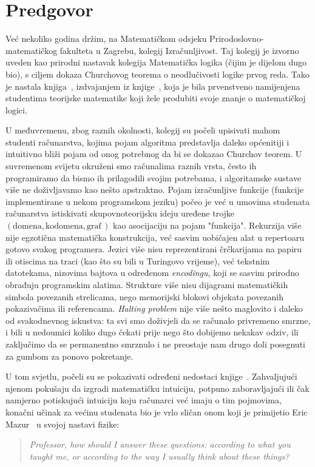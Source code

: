 \chapter{Predgovor}


Već nekoliko godina držim, na Matematičkom odsjeku Prirodoslovno-matematičkog fakulteta u Zagrebu, kolegij Izračunljivost. Taj kolegij je izvorno uveden kao prirodni nastavak kolegija Matematička logika (čijim je dijelom dugo bio), s ciljem dokaza Churchovog teorema o neodlučivosti logike prvog reda. Tako je nastala knjiga~\cite{skr:Vuk}, izdvajanjem iz knjige~\cite{skr:VukML}, koja je bila prvenstveno namijenjena studentima teorijske matematike koji žele produbiti svoje znanje o matematičkoj logici.

U međuvremenu, zbog raznih okolnosti, kolegij su počeli upisivati mahom studenti računarstva, kojima pojam algoritma predstavlja daleko općenitiji i intuitivno bliži pojam od onog potrebnog da bi se dokazao Churchov teorem. U suvremenom svijetu okruženi smo računalima raznih vrsta, često ih programiramo da bismo ih prilagodili svojim potrebama, i algoritamske sustave više ne doživljavamo kao nešto apstraktno. Pojam izračunljive funkcije (funkcije implementirane u nekom programskom jeziku) počeo je već u umovima studenata računarstva istiskivati skupovnoteorijsku ideju uređene trojke $(\text{domena},\text{kodomena},\text{graf}\,)$ kao asocijaciju na pojam "funkcija". Rekurzija više nije egzotična matematička konstrukcija, već sasvim uobičajen alat u repertoaru gotovo svakog programera. Jezici više nisu reprezentirani črčkarijama na papiru ili otiscima na traci (kao što su bili u Turingovo vrijeme), već tekstnim datotekama, nizovima bajtova u određenom \emph{encodingu}, koji se sasvim prirodno obrađuju programskim alatima. Strukture više nisu dijagrami matematičkih simbola povezanih strelicama, nego memorijski blokovi objekata povezanih pokazivačima ili referencama. \emph{Halting problem} nije više nešto maglovito i daleko od svakodnevnog iskustva: ta svi smo doživjeli da se računalo privremeno smrzne, i bili u nedoumici koliko dugo čekati prije nego što dobijemo nekakav odziv, ili zaključimo da se permanentno smrznulo i ne preostaje nam drugo doli posegnuti za gumbom za ponovo pokretanje. 

U tom svjetlu, počeli su se pokazivati određeni nedostaci knjige~\cite{skr:Vuk}. Zahvaljujući njenom pokušaju da izgradi matematičku intuiciju, potpuno zaboravljajući ili čak namjerno potiskujući intuiciju koju računarci već imaju o tim pojmovima, konačni učinak za većinu studenata bio je vrlo sličan onom koji je primijetio Eric Mazur~\cite{mazur} u svojoj nastavi fizike:
\begin{quote}
    \emph{Professor, how should I answer these questions: according to what you taught me, or according to the way I usually think about these things?}
\end{quote}

